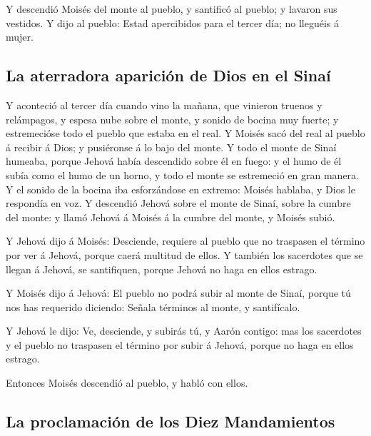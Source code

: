  Y descendió Moisés del monte al pueblo, y santificó al
pueblo; y lavaron sus vestidos.  Y dijo al pueblo: Estad
apercibidos para el tercer día; no lleguéis á mujer.

\hypertarget{la-aterradora-apariciuxf3n-de-dios-en-el-sinauxed}{%
\subsection{La aterradora aparición de Dios en el
Sinaí}\label{la-aterradora-apariciuxf3n-de-dios-en-el-sinauxed}}

 Y aconteció al tercer día cuando vino la mañana, que
vinieron truenos y relámpagos, y espesa nube sobre el monte, y sonido de
bocina muy fuerte; y estremecióse todo el pueblo que estaba en el real.
 Y Moisés sacó del real al pueblo á recibir á Dios; y
pusiéronse á lo bajo del monte.  Y todo el monte de Sinaí
humeaba, porque Jehová había descendido sobre él en fuego: y el humo de
él subía como el humo de un horno, y todo el monte se estremeció en gran
manera.  Y el sonido de la bocina iba esforzándose en
extremo: Moisés hablaba, y Dios le respondía en voz.  Y
descendió Jehová sobre el monte de Sinaí, sobre la cumbre del monte: y
llamó Jehová á Moisés á la cumbre del monte, y Moisés subió.

 Y Jehová dijo á Moisés: Desciende, requiere al pueblo que
no traspasen el término por ver á Jehová, porque caerá multitud de
ellos.  Y también los sacerdotes que se llegan á Jehová, se
santifiquen, porque Jehová no haga en ellos estrago.

 Y Moisés dijo á Jehová: El pueblo no podrá subir al monte
de Sinaí, porque tú nos has requerido diciendo: Señala términos al
monte, y santifícalo.

 Y Jehová le dijo: Ve, desciende, y subirás tú, y Aarón
contigo: mas los sacerdotes y el pueblo no traspasen el término por
subir á Jehová, porque no haga en ellos estrago.

 Entonces Moisés descendió al pueblo, y habló con ellos.

\hypertarget{la-proclamaciuxf3n-de-los-diez-mandamientos}{%
\subsection{La proclamación de los Diez
Mandamientos}\label{la-proclamaciuxf3n-de-los-diez-mandamientos}}

